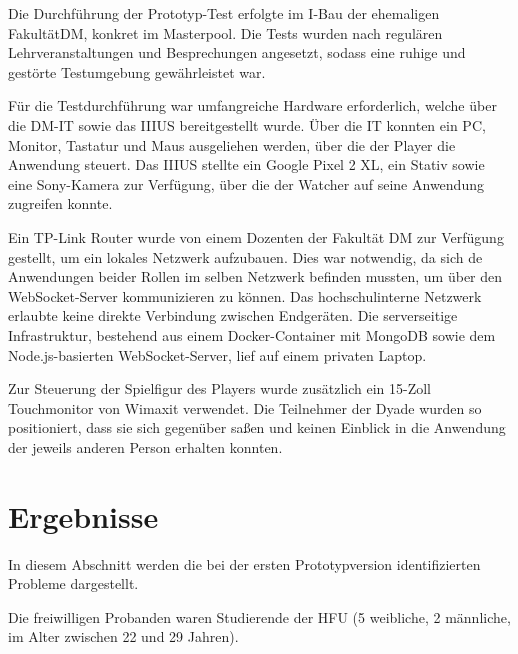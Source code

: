 Die Durchführung der Prototyp-Test erfolgte im I-Bau der ehemaligen Fakultät\ac{DM}, konkret im Masterpool. Die Tests wurden nach regulären Lehrveranstaltungen und Besprechungen angesetzt, sodass eine ruhige und gestörte Testumgebung gewährleistet war.

Für die Testdurchführung war umfangreiche Hardware erforderlich, welche über die \ac{DM}-IT sowie das \ac{IIIUS} bereitgestellt wurde. Über die IT konnten ein PC, Monitor, Tastatur und Maus ausgeliehen werden, über die der Player die Anwendung steuert. Das \ac{IIIUS} stellte ein Google Pixel 2 XL, ein Stativ sowie eine Sony-Kamera zur Verfügung, über die der Watcher auf seine Anwendung zugreifen konnte.

Ein TP-Link Router wurde von einem Dozenten der Fakultät \ac{DM} zur Verfügung gestellt, um ein lokales Netzwerk aufzubauen. Dies war notwendig, da sich de Anwendungen beider Rollen im selben Netzwerk befinden mussten, um über den WebSocket-Server kommunizieren zu können. Das hochschulinterne Netzwerk erlaubte keine direkte Verbindung zwischen Endgeräten. Die serverseitige Infrastruktur, bestehend aus einem Docker-Container mit MongoDB sowie dem Node.js-basierten WebSocket-Server, lief auf einem privaten Laptop.

Zur Steuerung der Spielfigur des Players wurde zusätzlich ein 15-Zoll Touchmonitor von Wimaxit verwendet. Die Teilnehmer der Dyade wurden so positioniert, dass sie sich gegenüber saßen und keinen Einblick in die Anwendung der jeweils anderen Person erhalten konnten.

\section{Ergebnisse}

In diesem Abschnitt werden die bei der ersten Prototypversion identifizierten Probleme dargestellt.

Die freiwilligen Probanden waren Studierende der \ac{HFU} (5 weibliche, 2 männliche, im Alter zwischen 22 und 29 Jahren).

